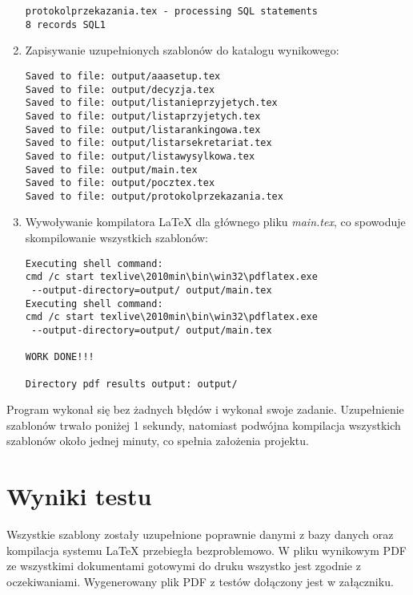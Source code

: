 \begin{enumerate}
\begin{lstlisting}
protokolprzekazania.tex - processing SQL statements
8 records SQL1

 \end{lstlisting}
 
   \item Zapisywanie uzupełnionych szablonów do katalogu wynikowego:
 \begin{lstlisting}
Saved to file: output/aaasetup.tex
Saved to file: output/decyzja.tex
Saved to file: output/listanieprzyjetych.tex
Saved to file: output/listaprzyjetych.tex
Saved to file: output/listarankingowa.tex
Saved to file: output/listarsekretariat.tex
Saved to file: output/listawysylkowa.tex
Saved to file: output/main.tex
Saved to file: output/pocztex.tex
Saved to file: output/protokolprzekazania.tex

 \end{lstlisting}
 
   \item Wywoływanie kompilatora LaTeX dla głównego pliku \emph{main.tex}, co spowoduje skompilowanie wszystkich szablonów:
 \begin{lstlisting}
Executing shell command:
cmd /c start texlive\2010min\bin\win32\pdflatex.exe
 --output-directory=output/ output/main.tex
Executing shell command:
cmd /c start texlive\2010min\bin\win32\pdflatex.exe
 --output-directory=output/ output/main.tex

WORK DONE!!!

Directory pdf results output: output/
 \end{lstlisting}
\end{enumerate}
Program wykonał się bez żadnych błędów i wykonał swoje zadanie. Uzupełnienie szablonów trwało poniżej 1 sekundy, natomiast podwójna kompilacja wszystkich szablonów około jednej minuty, co spełnia założenia projektu. 

\section{Wyniki testu}
Wszystkie szablony zostały uzupełnione poprawnie danymi z bazy danych oraz kompilacja systemu LaTeX przebiegła bezproblemowo. W pliku wynikowym PDF ze wszystkimi dokumentami gotowymi do druku wszystko jest zgodnie z oczekiwaniami. Wygenerowany plik PDF z testów dołączony jest w załączniku.


